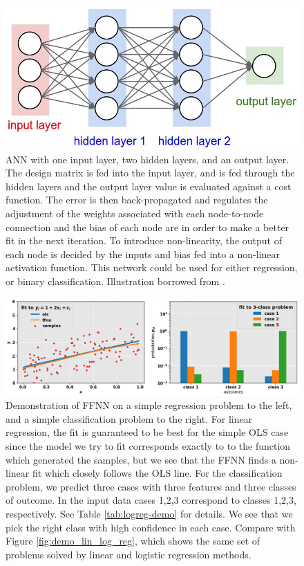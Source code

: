\documentclass[]{article}
\begin{document}
\begin{figure}[!htb]
	\centering
	\includegraphics[width=1\linewidth]{ann-illustration.jpeg}
	\caption{ANN with one input layer, two hidden layers, and an output layer. The design matrix is fed into the input layer, and is fed through the hidden layers and the output layer value is evaluated against a cost function. The error is then back-propagated and regulates the adjustment of the weights associated with each node-to-node connection and the bias of each node are in order to make a better fit in the next iteration. To introduce non-linearity, the output of each node is decided by the inputs and bias fed into a non-linear activation function. This network could be used for either regression, or binary classification. Illustration borrowed from \cite{fys-stk4155-notes}.}
	\label{fig:ann-illustration}
\end{figure}

\begin{figure}[!htb]
	\centering
	\includegraphics[width=1\linewidth]{demo_lin_log_ffnn.png}
	\caption{Demonstration of FFNN on a simple regression problem to the left, and a simple classification problem to the right. For linear regression, the fit is guaranteed to be best for the simple OLS case since the model we try to fit corresponds exactly to to the function which generated the samples, but we see that the FFNN finds a non-linear fit which closely follows the OLS line. For the classification problem, we predict three cases with three features and three classes of outcome. In the input data cases 1,2,3 correspond to classes 1,2,3, respectively. See Table \ref{tab:logreg-demo} for details. We see that we pick the right class with high confidence in each case. Compare with Figure \ref{fig:demo_lin_log_reg}, which shows the same set of problems solved by linear and logistic regression methods.}
	\label{fig:demo_lin_log_ffnn}
\end{figure}
\end{document}
